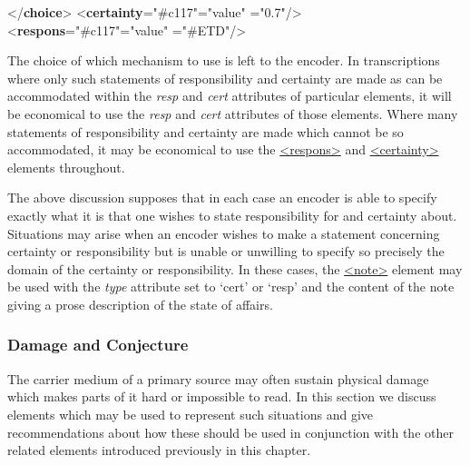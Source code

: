 \begin{shaded}
{</\textbf{choice}>}\mbox{}\newline 
{<\textbf{certainty}\hspace*{1em}{target}="{\#c117}"\hspace*{1em}{locus}="{value}"\mbox{}\newline 
\hspace*{1em}{degree}="{0.7}"/>}\mbox{}\newline 
{<\textbf{respons}\hspace*{1em}{target}="{\#c117}"\hspace*{1em}{locus}="{value}"\mbox{}\newline 
\hspace*{1em}{resp}="{\#ETD}"/>}\end{shaded}\egroup\par \noindent  The choice of which mechanism to use is left to the encoder. In transcriptions where only such statements of responsibility and certainty are made as can be accommodated within the {\itshape resp} and {\itshape cert} attributes of particular elements, it will be economical to use the {\itshape resp} and {\itshape cert} attributes of those elements. Where many statements of responsibility and certainty are made which cannot be so accommodated, it may be economical to use the \hyperref[TEI.respons]{<respons>} and \hyperref[TEI.certainty]{<certainty>} elements throughout.\par
The above discussion supposes that in each case an encoder is able to specify exactly what it is that one wishes to state responsibility for and certainty about. Situations may arise when an encoder wishes to make a statement concerning certainty or responsibility but is unable or unwilling to specify so precisely the domain of the certainty or responsibility. In these cases, the \hyperref[TEI.note]{<note>} element may be used with the {\itshape type} attribute set to ‘cert’ or ‘resp’ and the content of the note giving a prose description of the state of affairs.
\subsubsection[{Damage and Conjecture}]{Damage and Conjecture}\label{PHDAMCON}\par
The carrier medium of a primary source may often sustain physical damage which makes parts of it hard or impossible to read. In this section we discuss elements which may be used to represent such situations and give recommendations about how these should be used in conjunction with the other related elements introduced previously in this chapter. 
